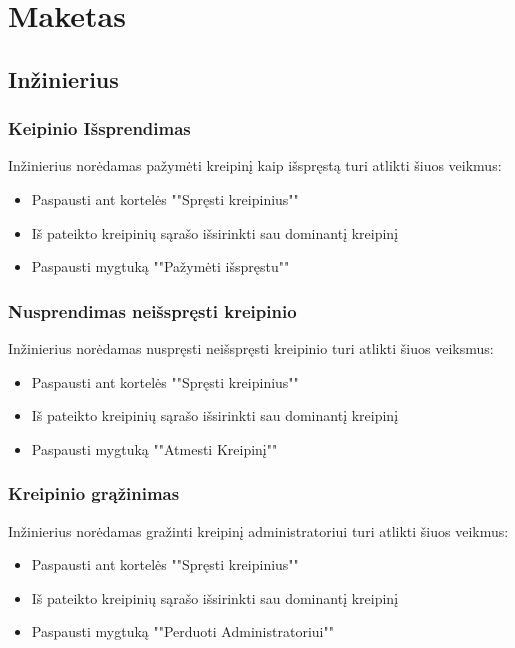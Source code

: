 
\section{Maketas}

\subsection{Inžinierius}
	\subsubsection{Keipinio Išsprendimas}
	Inžinierius norėdamas pažymėti kreipinį kaip išspręstą turi atlikti šiuos veikmus:
	\begin{itemize}
		\item Paspausti ant kortelės ""Spręsti kreipinius"" 
		\item Iš pateikto kreipinių sąrašo išsirinkti sau dominantį kreipinį 
		\item Paspausti mygtuką ""Pažymėti išspręstu"" 
	\end{itemize}
	\subsubsection{Nusprendimas neišspręsti kreipinio}
	Inžinierius norėdamas nuspręsti neišspręsti kreipinio turi atlikti šiuos veiksmus:
	\begin{itemize}
		\item Paspausti ant kortelės ""Spręsti kreipinius"" 
		\item Iš pateikto kreipinių sąrašo išsirinkti sau dominantį kreipinį 
		\item Paspausti mygtuką ""Atmesti Kreipinį"" 
	\end{itemize}
	\subsubsection{Kreipinio grąžinimas}
	Inžinierius norėdamas gražinti kreipinį administratoriui turi atlikti šiuos veikmus:
	\begin{itemize}
		\item Paspausti ant kortelės ""Spręsti kreipinius"" 
		\item Iš pateikto kreipinių sąrašo išsirinkti sau dominantį kreipinį 
		\item Paspausti mygtuką ""Perduoti Administratoriui"" 
	\end{itemize}

